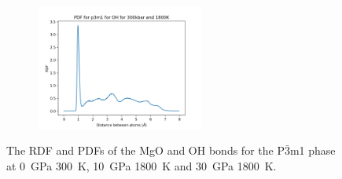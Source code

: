 \documentclass[a4paper,12pt]{article}
\begin{document}
\begin{figure}[h!!!!!!!!!!!!]
\begin{subfigure}{0.32\textwidth}
	\label{Fig12h}
\end{subfigure}%
	\begin{subfigure}{0.32\textwidth}
	\centering
	\includegraphics[width=5.5cm]{figures/pdfOHp3p300t1800c100.png}
	\label{Fig12i}
\end{subfigure}%
\caption{The RDF and PDFs of the MgO and OH bonds for the P$\bar3$m1 phase at \SI{0}{\GPa} \SI{300}{\K}, \SI{10}{\GPa} \SI{1800}{\K} and \SI{30}{\GPa} \SI{1800}{\K}.}
\label{Fig12}
\end{figure}
\end{document}
